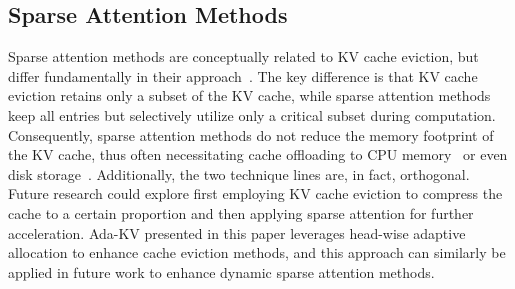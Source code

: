 \subsection{Sparse Attention Methods}
Sparse attention methods are conceptually related to KV cache eviction, but differ fundamentally in their approach~\cite{jiang2024minference,li2025mminference,liu2024retrievalattention,chen2024arkvale,zhang2025pqcache,sun2025breaking}. The key difference is that KV cache eviction retains only a subset of the KV cache, while sparse attention methods keep all entries but selectively utilize only a critical subset during computation. Consequently, sparse attention methods do not reduce the memory footprint of the KV cache, thus often necessitating cache offloading to CPU memory~\cite{liu2024retrievalattention,chen2024arkvale,zhang2025pqcache} or even disk storage~\cite{sun2025breaking}. Additionally, the two technique lines are, in fact, orthogonal. Future research could explore first employing KV cache eviction to compress the cache to a certain proportion and then applying sparse attention for further acceleration. Ada-KV presented in this paper leverages head-wise adaptive allocation to enhance cache eviction methods, and this approach can similarly be applied in future work to enhance dynamic sparse attention methods.
